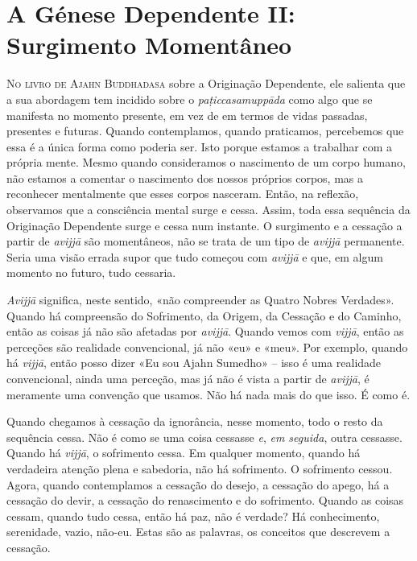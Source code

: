\chapter{A Génese Dependente II: Surgimento Momentâneo}

\lettrine{N}{o livro de Ajahn Buddhadasa} sobre a Originação Dependente, ele
salienta que a sua abordagem tem incidido sobre o \emph{paṭiccasamuppāda} como
algo que se manifesta no momento presente, em vez de em termos de vidas
passadas, presentes e futuras. Quando contemplamos, quando praticamos,
percebemos que essa é a única forma como poderia ser. Isto porque estamos a
trabalhar com a própria mente. Mesmo quando consideramos o nascimento de um
corpo humano, não estamos a comentar o nascimento dos nossos próprios corpos,
mas a reconhecer mentalmente que esses corpos nasceram. Então, na reflexão,
observamos que a consciência mental surge e cessa. Assim, toda essa sequência da
Originação Dependente surge e cessa num instante. O surgimento e a cessação a
partir de \emph{avijjā} são momentâneos, não se trata de um tipo de
\emph{avijjā} permanente. Seria uma visão errada supor que tudo começou com
\emph{avijjā} e que, em algum momento no futuro, tudo cessaria.

\emph{Avijjā} significa, neste sentido, «não compreender as Quatro Nobres
Verdades». Quando há compreensão do Sofrimento, da Origem, da Cessação e do
Caminho, então as coisas já não são afetadas por \emph{avijjā}. Quando vemos com
\emph{vijjā}, então as perceções são realidade convencional, já não «eu» e
«meu». Por exemplo, quando há \emph{vijjā}, então posso dizer «Eu sou Ajahn
Sumedho» -- isso é uma realidade convencional, ainda uma perceção, mas já não é
vista a partir de \emph{avijjā}, é meramente uma convenção que usamos. Não há
nada mais do que isso. É como é.

Quando chegamos à cessação da ignorância, nesse momento, todo o resto da
sequência cessa. Não é como se uma coisa cessasse \emph{e}, \emph{em seguida},
outra cessasse. Quando há \emph{vijjā}, o sofrimento cessa. Em qualquer momento,
quando há verdadeira atenção plena e sabedoria, não há sofrimento. O sofrimento
cessou. Agora, quando contemplamos a cessação do desejo, a cessação do apego, há
a cessação do devir, a cessação do renascimento e do sofrimento. Quando as
coisas cessam, quando tudo cessa, então há paz, não é verdade? Há conhecimento,
serenidade, vazio, não-eu. Estas são as palavras, os conceitos que descrevem a
cessação.

